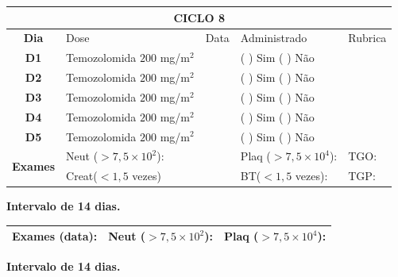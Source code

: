 \documentclass[11pt,a4paper,oldfontcommands]{memoir}
\begin{document}
\begin{center}
\begin{longtable}{p{1cm}p{4cm}|p{1cm}|p{4.6cm}|p{3cm}}
	\hline
	\multicolumn{5}{c}{\textbf{CICLO 8}}\\
\hline
    \multicolumn{1}{c|}{\multirow{1}{*}{\textbf{Dia}}}&{Dose}&{Data}&{Administrado}&{Rubrica} \\
    \hline
    \multicolumn{1}{c|}{\multirow{1}{*}{\textbf{D1}}}&{Temozolomida \(200\) mg/m\(^2\)}&&{(  ) Sim (  ) Não}&\\
    \multicolumn{1}{c|}{\multirow{1}{*}{\textbf{D2}}}&{Temozolomida \(200\) mg/m\(^2\)}&&{(  ) Sim (  ) Não}&\\
    \multicolumn{1}{c|}{\multirow{1}{*}{\textbf{D3}}}&{Temozolomida \(200\) mg/m\(^2\)}&&{(  ) Sim (  ) Não}&\\
    \multicolumn{1}{c|}{\multirow{1}{*}{\textbf{D4}}}&{Temozolomida \(200\) mg/m\(^2\)}&&{(  ) Sim (  ) Não}&\\
    \multicolumn{1}{c|}{\multirow{1}{*}{\textbf{D5}}}&{Temozolomida \(200\) mg/m\(^2\)}&&{(  ) Sim (  ) Não}&\\
    \hline
    \multicolumn{1}{c|}{\multirow{2}{*}{\textbf{Exames}}}&\multicolumn{2}{l|}{Neut (\(>7,5\times10^2\)):}&{Plaq (\(>7,5\times10^4\)):}&{TGO:}\\
    \cline{2-5}
    \multicolumn{1}{c|}{\multirow{2}{*}{{}}}&\multicolumn{2}{l|}{Creat(\(<1,5\) vezes)}&{BT(\(<1,5\) vezes):}&{TGP:}
    \\
    \hline
\end{longtable}
\textbf{Intervalo de 14 dias.}
\begin{longtable}{p{5cm}|p{5cm}|p{4.5cm}}
    \hline
    \textbf{Exames (data):}&{Neut (\(>7,5\times10^2\)):}&{Plaq (\(>7,5\times10^4\)):}
    \\
    \hline
\end{longtable}
\textbf{Intervalo de 14 dias.}
\end{center}
\end{document}
